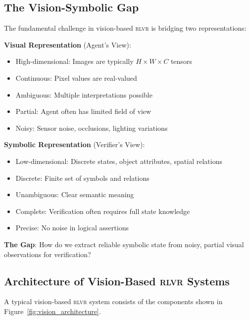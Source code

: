 \documentclass[11pt,a4paper]{article}
\newcommand{\rlvr}{\textsc{rlvr}}
\begin{document}
\subsection{The Vision-Symbolic Gap}
\label{sec:vision_gap}

The fundamental challenge in vision-based \rlvr{} is bridging two representations:

\textbf{Visual Representation} (Agent's View):
\begin{itemize}[leftmargin=*]
    \item High-dimensional: Images are typically $H \times W \times C$ tensors
    \item Continuous: Pixel values are real-valued
    \item Ambiguous: Multiple interpretations possible
    \item Partial: Agent often has limited field of view
    \item Noisy: Sensor noise, occlusions, lighting variations
\end{itemize}

\textbf{Symbolic Representation} (Verifier's View):
\begin{itemize}[leftmargin=*]
    \item Low-dimensional: Discrete states, object attributes, spatial relations
    \item Discrete: Finite set of symbols and relations
    \item Unambiguous: Clear semantic meaning
    \item Complete: Verification often requires full state knowledge
    \item Precise: No noise in logical assertions
\end{itemize}

\textbf{The Gap}: How do we extract reliable symbolic state from noisy, partial visual observations for verification?

\subsection{Architecture of Vision-Based \rlvr{} Systems}
\label{sec:vision_architecture}

A typical vision-based \rlvr{} system consists of the components shown in Figure~\ref{fig:vision_architecture}.
\end{document}
